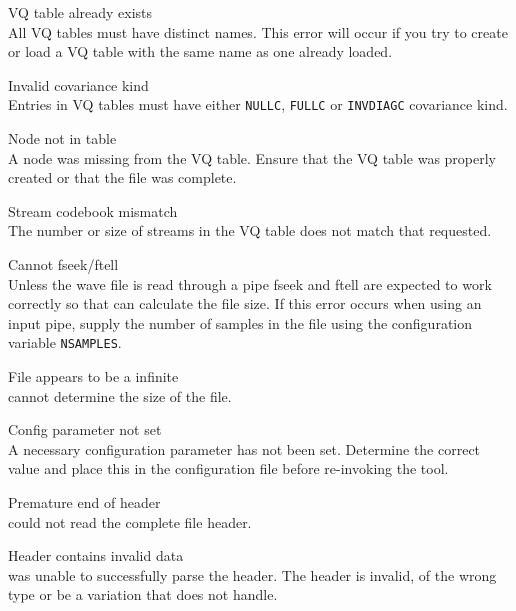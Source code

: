 \begin{itemize}
\begin{itemize}
    VQ table already exists\\
        All VQ tables must have distinct names.  This error will occur if you
        try to create or load a VQ table with the same name as one already
        loaded.

    Invalid covariance kind\\
        Entries in VQ tables must have either \texttt{NULLC}, \texttt{FULLC} or
        \texttt{INVDIAGC} covariance kind.

    Node not in table\\
        A node was missing from the VQ table.  Ensure that the VQ table was 
        properly created or that the file was complete.

    Stream codebook mismatch\\
        The number or size of streams in the VQ table does not match that 
        requested.

\end{itemize}


\begin{itemize}
    Cannot fseek/ftell\\
        Unless the wave file is read through a pipe fseek and ftell are 
        expected to work correctly so that  can calculate the 
        file size.  If this error occurs when using an input pipe, supply 
        the number of samples in the file using the configuration variable
        \texttt{NSAMPLES}.

    File appears to be a infinite\\
         cannot determine the size of the file.

    Config parameter not set\\
        A necessary configuration parameter has not been set.  Determine the 
        correct value and place this in the configuration file before 
        re-invoking the tool.

    Premature end of header\\
         could not read the complete file header.

    Header contains invalid data\\
         was unable to successfully parse the header.  The header
        is invalid, of the wrong type or be a variation that  does
        not handle.


\end{itemize}
\end{itemize}
